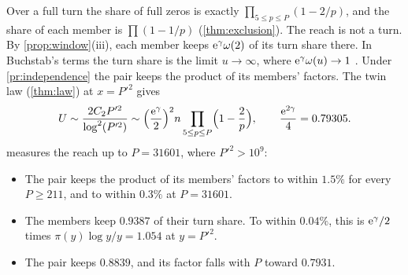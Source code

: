 \documentclass[11pt]{article}
\theoremstyle{definition}\newtheorem{definition}[theorem]{Definition}
\theoremstyle{remark}\newtheorem{remark}[theorem]{Remark}
\begin{document}
Over a full turn the share of full zeros is exactly $\prod_{5\le p\le P}(1-2/p)$, and the share of each member is $\prod(1-1/p)$ (\cref{thm:exclusion}). The reach is not a turn. By \cref{prop:window}(iii), each member keeps $\mathrm e^\gamma\omega(2)$ of its turn share there. In Buchstab's terms the turn share is the limit $u\to\infty$, where $\mathrm e^\gamma\omega(u)\to1$ \cite{FI}. Under \cref{pr:independence} the pair keeps the product of its members' factors. The twin law (\cref{thm:law}) at $x=P'^2$ gives
\[
U\sim\frac{2C_2P'^2}{\log^2(P'^2)}\sim\Bigl(\frac{\mathrm e^{\gamma}}2\Bigr)^2n\prod_{5\le p\le P}\Bigl(1-\frac2p\Bigr),\qquad \frac{\mathrm e^{2\gamma}}4=0.79305.
\]
 measures the reach up to $P=31601$, where $P'^2>10^9$:
\begin{itemize}
\item The pair keeps the product of its members' factors to within $1.5\%$ for every $P\ge211$, and to within $0.3\%$ at $P=31601$.
\item The members keep $0.9387$ of their turn share. To within $0.04\%$, this is $\mathrm e^\gamma/2$ times $\pi(y)\log y/y=1.054$ at $y=P'^2$.
\item The pair keeps $0.8839$, and its factor falls with $P$ toward $0.7931$.
\end{itemize}
\end{document}
